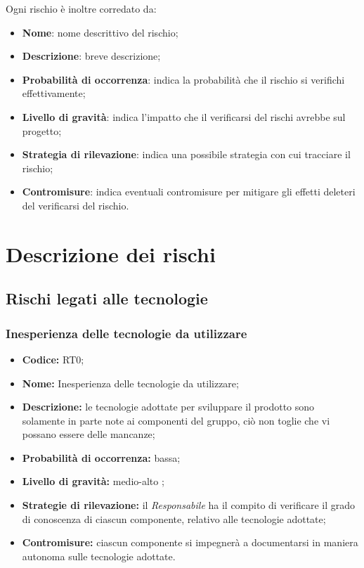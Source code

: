 \documentclass[../PianodiProgetto.tex]{subfiles}
\begin{document}
	Ogni rischio è inoltre corredato da:
	
	\begin{itemize}
		\item \textbf{Nome}: nome descrittivo del rischio;
		\item \textbf{Descrizione}: breve descrizione;
		\item \textbf{Probabilità di occorrenza}: indica la probabilità che il rischio si verifichi effettivamente;
		\item \textbf{Livello di gravità}: indica l'impatto che il verificarsi del rischi avrebbe sul progetto;
		\item \textbf{Strategia di rilevazione}: indica una possibile strategia con cui tracciare il rischio;
		\item \textbf{Contromisure}: indica eventuali contromisure per mitigare gli effetti deleteri del verificarsi del rischio.
	\end{itemize}
	
	\section{Descrizione dei rischi} 
	
	\subsection{Rischi legati alle tecnologie}
	
	\subsubsection{Inesperienza delle tecnologie da utilizzare}
	\begin{itemize}
		\item \textbf{Codice:} RT0;
		\item \textbf{Nome:} Inesperienza delle tecnologie da utilizzare;
		\item \textbf{Descrizione:} le tecnologie adottate per sviluppare il prodotto sono solamente in parte note ai componenti del gruppo, ciò non toglie che vi possano essere delle mancanze;
		\item \textbf{Probabilità di occorrenza:} bassa;
		\item \textbf{Livello di gravità:} medio-alto ;
		\item \textbf{Strategie di rilevazione:} il \textit{Responsabile} ha il compito di verificare il grado di conoscenza di ciascun componente, relativo alle tecnologie adottate;
		\item \textbf{Contromisure:} ciascun componente si impegnerà a documentarsi in maniera autonoma sulle tecnologie adottate. 
	\end{itemize}
	
\end{document}
